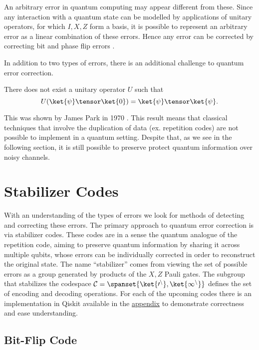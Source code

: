 \documentclass{article}
\begin{document}
        An arbitrary error in quantum computing may appear different from these.
        Since any interaction with a quantum state can be modelled by applications of unitary operators, for which $I, X, Z$ form a basis, it is possible to represent an arbitrary error as a linear combination of these errors.
        Hence any error can be corrected by correcting bit and phase flip errors \cite{Nielsen}.

        In addition to two types of errors, there is an additional challenge to quantum error correction.
        \begin{theorem}
                There does not exist a unitary operator $U$ such that
                        $$U (\ket{\psi} \tensor \ket{0}) = \ket{\psi} \tensor \ket{\psi}.$$
        \end{theorem}
        This was shown by James Park in 1970 \cite{Park}.
        This result means that classical techniques that involve the duplication of data (ex. repetition codes) are not possible to implement in a quantum setting.
        Despite that, as we see in the following section, it is still possible to preserve protect quantum information over noisy channels.


\section{Stabilizer Codes}

        With an understanding of the types of errors we look for methods of detecting and correcting these errors.
        The primary approach to quantum error correction is via stabilizer codes.
        These codes are in a sense the quantum analogue of the repetition code, aiming to preserve quantum information by sharing it across multiple qubits, whose errors can be individually corrected in order to reconstruct the original state.
        The name ``stabilizer'' comes from viewing the set of possible errors as a group generated by products of the $X, Z$ Pauli gates.
        The subgroup that stabilizes the codespace $\cal{C} = \spanset\{\ket{0^n}, \ket{1^n}\}$ defines the set of encoding and decoding operations.
        For each of the upcoming codes there is an implementation in Qiskit available in the \hyperref[appendix:gates]{appendix} to demonstrate correctness and ease understanding.

        \subsection{Bit-Flip Code}
\end{document}
